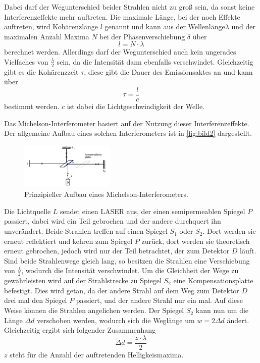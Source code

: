 Dabei darf der Wegunterschied beider Strahlen nicht zu groß sein, da sonst keine Interferenzeffekte mehr auftreten. Die maximale Länge, bei der noch Effekte auftreten, wird Kohärenzlänge $l$ genannt und kann aus der Wellenlänge$\lambda$ und der maximalen Anzahl Maxima $N$ bei der Phasenverschiebung $\delta$ über 
\begin{equation}
    l = N \cdot \lambda
\end{equation}
berechnet werden.
Allerdings darf der Wegunterschied auch kein ungerades Vielfaches von $\frac{\lambda}{2}$ sein, da die Intensität dann ebenfalls verschwindet.
Gleichzeitig gibt es die Kohärenzzeit $\tau$, diese gibt die Dauer des Emissionsaktes an und kann über 
\begin{equation}
    \tau = \frac{l}{c}
\end{equation}
bestimmt werden. $c$ ist dabei die Lichtgeschwindigkeit der Welle.

Das Michelson-Interferometer basiert auf der Nutzung dieser Interferenzeffekte.
Der allgemeine Aufbau eines solchen Interferometers ist in \autoref{fig:bild2} dargestellt.

\begin{figure}
    \centering
    \includegraphics[width=0.4\textwidth]{images/bild2.png}
    \caption{Prinzipieller Aufbau eines Michelson-Interferometers.\cite{V401}}
    \label{fig:bild2}
\end{figure}

Die Lichtquelle $L$ sendet einen LASER aus, der einen semipermeablen Spiegel $P$ passiert, dabei wird ein Teil gebrochen und der andere durchquert ihn unverändert.
Beide Strahlen treffen auf einen Spiegel $S_\text{1}$ oder $S_\text{2}$.
Dort werden sie erneut reflektiert und kehren zum Spiegel $P$ zurück, dort werden sie theoretisch erneut gebrochen, jedoch wird nur der Teil betrachtet, der zum Detektor $D$ läuft.
Sind beide Strahlenwege gleich lang, so besitzen die Strahlen eine Verschiebung von $\frac{\lambda}{2}$, wodurch die Intensität verschwindet.
Um die Gleichheit der Wege zu gewährleisten wird auf der Strahlstrecke zu Spiegel $S_\text{2}$ eine Kompensationsplatte befestigt.
Dies wird getan, da der andere Strahl auf dem Weg zum Detektor $D$ drei mal den Spiegel $P$ passiert, und der andere Strahl nur ein mal. 
Auf diese Weise können die Strahlen angelichen werden.
Der Spiegel $S_\text{2}$ kann nun um die Länge $\Delta d$ verschoben werden, wodurch sich die Weglänge um $w = 2\Delta d$ ändert.
Gleichzeitig ergibt sich folgender Zusammenhang
\begin{equation}
    \Delta d = \frac{z \cdot \lambda}{2}
    \label{eq:welle}
\end{equation}
$z$ steht für die Anzahl der auftretenden Helligkeismaxima.

